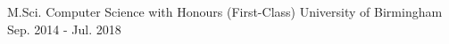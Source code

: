 

\begin{cventries}

  \cventry
  {M.Sci. Computer Science with Honours (First-Class)} %
    {University of Birmingham} %
    {} %
    {Sep. 2014 - Jul. 2018} %
    {}


\end{cventries}
